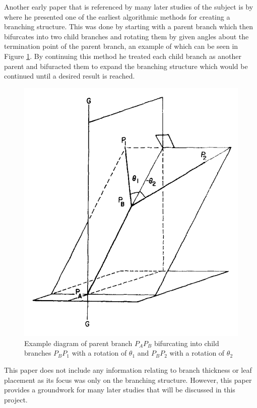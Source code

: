 \documentclass[final]{cmpreport}
\begin{document}
Another early paper that is referenced by many later studies of the subject is by
\cite{honda1971description} where he presented one of the earliest algorithmic 
methods for creating a branching structure. This was done by starting with a parent 
branch which then bifurcates into two child branches and rotating them by given 
angles about the termination point of the parent branch, an example of which 
can be seen in Figure \ref{fig:honda-bifurcation}. By continuing this 
method he treated each child branch as another parent and bifuracted them to 
expand the branching structure which would be continued until a desired result is 
reached.

\begin{figure}[ht]
    \includegraphics[scale=0.5]{honda-bifurcation.PNG}
    \centering
    \captionsetup{justification=centering}
    \caption{Example diagram of parent branch $P_AP_B$ bifurcating into child branches
    $P_BP_1$ with a rotation of $\theta_1$ and $P_BP_2$ with a rotation of \textminus$\theta_2$}
    \label{fig:honda-bifurcation}
\end{figure}

This paper does not include any information relating to branch thickness or leaf 
placement as its focus was only on the branching structure. However, this paper 
provides a groundwork for many later studies that will be discussed in this project.
\end{document}
